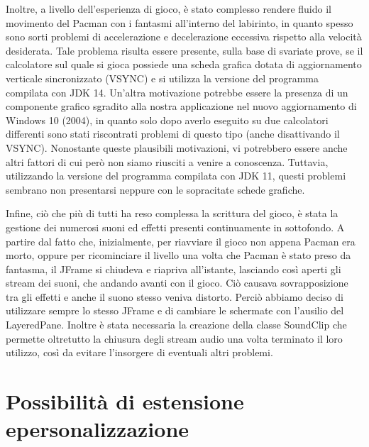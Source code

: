 \documentclass[12pt,a4paper]{report}
\begin{document}
Inoltre, a livello dell’esperienza di gioco, è stato complesso rendere fluido il movimento del Pacman con i fantasmi all’interno del labirinto, in quanto spesso sono sorti problemi di accelerazione e decelerazione eccessiva rispetto alla velocità desiderata. Tale problema risulta essere presente, sulla base di svariate prove, se il calcolatore sul quale si gioca possiede una scheda grafica dotata di aggiornamento verticale sincronizzato (VSYNC) e si utilizza la versione del programma compilata con JDK 14. Un’altra motivazione potrebbe essere la presenza di un componente grafico sgradito alla nostra applicazione nel nuovo aggiornamento di Windows 10 (2004), in quanto solo dopo averlo eseguito su due calcolatori differenti sono stati riscontrati problemi di questo tipo (anche disattivando il VSYNC). Nonostante queste plausibili motivazioni, vi potrebbero essere anche altri fattori di cui però non siamo riusciti a venire a conoscenza. Tuttavia, utilizzando la versione del programma compilata con JDK 11, questi problemi sembrano non presentarsi neppure con le sopracitate schede grafiche.

Infine, ciò che più di tutti ha reso complessa la scrittura del gioco, è stata la gestione dei numerosi suoni ed effetti presenti continuamente in sottofondo. 
A partire dal fatto che, inizialmente, per riavviare il gioco non appena Pacman era morto, oppure per ricominciare il livello una volta che Pacman è stato preso da fantasma, il JFrame si chiudeva e riapriva all’istante, lasciando così aperti gli stream dei suoni, che andando avanti con il gioco. Ciò causava sovrapposizione tra gli effetti e anche il suono stesso veniva distorto. Perciò abbiamo deciso di utilizzare sempre lo stesso JFrame e di cambiare le schermate con l'ausilio del LayeredPane. Inoltre è stata necessaria la creazione della classe SoundClip che permette oltretutto la chiusura degli stream audio una volta terminato il loro utilizzo, così da evitare l’insorgere di eventuali altri problemi.




\chapter{Possibilità di estensione e\newline personalizzazione}\label{ch:est-pers}
\end{document}
